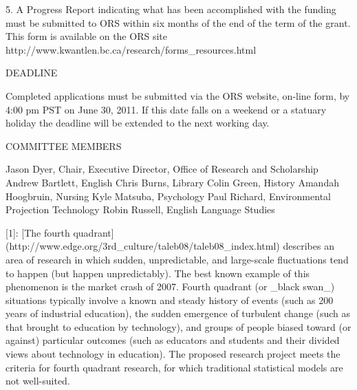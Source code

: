 5. A Progress Report indicating what has been accomplished with the funding must be submitted to ORS within six months of the end of the term of the grant. This form is available on the ORS site http://www.kwantlen.bc.ca/research/forms_resources.html


DEADLINE

Completed applications must be submitted via the ORS website, on-line form, by 4:00 pm PST on June 30, 2011. If this date falls on a weekend or a statuary holiday the deadline will be extended to the next working day.  

COMMITTEE MEMBERS

Jason Dyer, Chair, Executive Director, Office of Research and Scholarship
Andrew Bartlett, English
Chris Burns, Library
Colin Green, History
Amandah Hoogbruin, Nursing
Kyle Matsuba, Psychology
Paul Richard, Environmental Projection Technology
Robin Russell, English Language Studies

[1]: [The fourth quadrant](http://www.edge.org/3rd_culture/taleb08/taleb08_index.html) describes an area of research in which sudden, unpredictable, and large-scale fluctuations tend to happen (but happen unpredictably). The best known example of this phenomenon is the market crash of 2007. Fourth quadrant (or _black swan_) situations typically involve a known and steady history of events (such as 200 years of industrial education), the sudden emergence of turbulent change (such as that brought to education by technology), and groups of people biased toward (or against) particular outcomes (such as educators and students and their divided views about technology in education). The proposed research project meets the criteria for fourth quadrant research, for which traditional statistical models are not well-suited.

